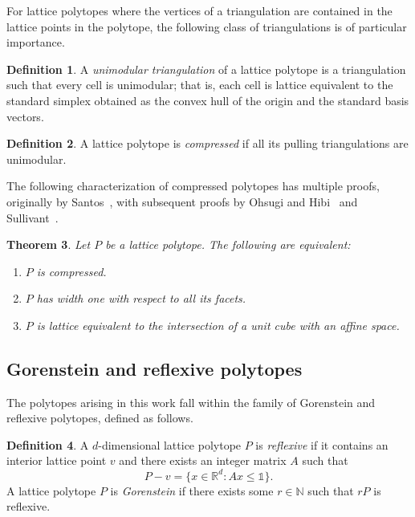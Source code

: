 \documentclass[12pt]{amsart}
\newtheorem{theorem}{Theorem}[section]
\theoremstyle{definition}
\newtheorem{definition}[theorem]{Definition}
\newcommand{\defn}[1]{\emph{\color{blue} #1}}
\begin{document}
For lattice polytopes where the vertices of a triangulation are contained in the lattice points in the polytope, the following class of triangulations is of particular importance.

\begin{definition}
    A \defn{unimodular triangulation} of a lattice polytope is a triangulation such that every cell is unimodular; that is, each cell is lattice equivalent to the standard simplex obtained as the convex hull of the origin and the standard basis vectors.
\end{definition}

\begin{definition}
    A lattice polytope is \defn{compressed} if all its pulling triangulations are unimodular. 
\end{definition}

The following characterization of compressed polytopes has multiple proofs, originally by Santos~\cite{unimodulartriangulationssurvey}, with subsequent proofs by Ohsugi and Hibi~\cite{ohsugihibicompressed} and Sullivant~\cite{sullivantcompressed}.

\begin{theorem}
    Let $P$ be a lattice polytope. The following are equivalent:

    \begin{enumerate}
        \item $P$ is compressed.
        \item $P$ has width one with respect to all its facets.
        \item $P$ is lattice equivalent to the intersection of a unit cube with an affine space.
    \end{enumerate}
\end{theorem}

\subsection{Gorenstein and reflexive polytopes}

The polytopes arising in this work fall within the family of Gorenstein and reflexive polytopes, defined as follows.

\begin{definition}\label{def:reflexive}
    A $d$-dimensional lattice polytope $P$ is \defn{reflexive} if it contains an interior lattice point $v$ and there exists an integer matrix $A$ such that
    \[
        P - v = \{ x \in \mathbb{R}^d: A x \leq \mathbb{1}\}.
    \]
    A lattice polytope $P$ is \defn{Gorenstein} if there exists some $r \in \mathbb{N}$ such that $r P$ is reflexive.
\end{definition}
\end{document}
